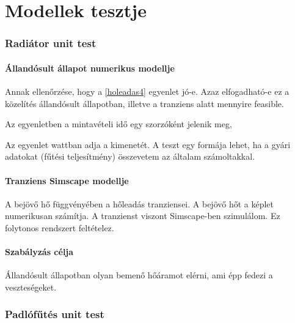 \chapter{Modellek tesztje}

\subsection{Radiátor unit test}

\subsubsection{Állandósult állapot numerikus modellje}

Annak ellenőrzése, hogy a \ref{holeadas4} egyenlet jó-e. Azaz elfogadható-e ez a közelítés állandósult állapotban, illetve a tranziens alatt mennyire feasible. 

Az egyenletben a mintavételi idő egy szorzóként jelenik meg, 

Az egyenlet wattban adja a kimenetét.
A teszt egy formája lehet, ha a gyári adatokat (fűtési teljesítmény) összevetem az általam számoltakkal.

\subsubsection{Tranziens Simscape modellje}
A bejövő hő függvényében a hőleadás tranziensei. A bejövő hőt a képlet numerikusan számítja. A tranzienst viszont Simscape-ben szimulálom. Ez folytonos rendszert feltételez.

\subsubsection{Szabályzás célja}

Állandósult állapotban olyan bemenő hőáramot elérni, ami épp fedezi a veszteségeket.

\subsection{Padlófűtés unit test}
